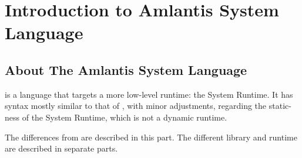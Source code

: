 
\chapter{Introduction to Amlantis System Language}

\minitoc

\newpage


\section{About The Amlantis System Language}

\AmlSystem is a language that targets a more low-level runtime: the System Runtime. It has syntax mostly similar to that of \Aml, with minor adjustments, regarding the static-ness of the System Runtime, which is not a dynamic runtime. 

The differences from \Aml are described in this part. The different library and runtime are described in separate parts. %






